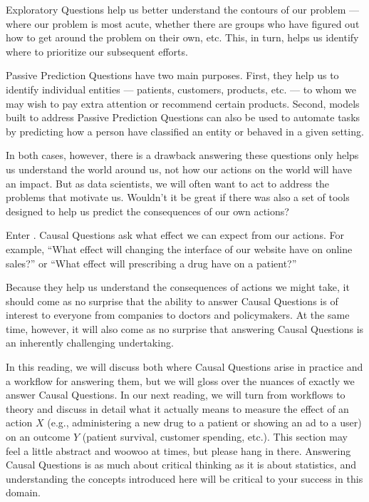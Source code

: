 \documentclass[letterpaper,10pt,english]{jupyterBook}
\begin{document}
\sphinxAtStartPar
Exploratory Questions help us better understand the contours of our problem — where our problem is most acute, whether there are groups who have figured out how to get around the problem on their own, etc. This, in turn, helps us identify where to prioritize our subsequent efforts.

\sphinxAtStartPar
Passive Prediction Questions have two main purposes. First, they help us to identify individual entities — patients, customers, products, etc. — to whom we may wish to pay extra attention or recommend certain products. Second, models built to address Passive Prediction Questions can also be used to automate tasks by predicting how a person  have classified an entity or behaved in a given setting.

\sphinxAtStartPar
In both cases, however, there is a drawback \sphinxhyphen{} answering these questions only helps us understand the world around us, not how our actions on the world will have an impact. But as data scientists, we will often want to act to address the problems that motivate us. Wouldn’t it be great if there was also a set of tools designed to help us predict the consequences of our own actions?

\sphinxAtStartPar
Enter . Causal Questions ask what effect we can expect from our actions. For example, “What effect will changing the interface of our website have on online sales?” or “What effect will prescribing a drug have on a patient?”

\sphinxAtStartPar
Because they help us understand the consequences of actions we might take, it should come as no surprise that the ability to answer Causal Questions is of  interest to everyone from companies to doctors and policymakers. At the same time, however, it will also come as no surprise that answering Causal Questions is an inherently challenging undertaking.

\sphinxAtStartPar
In this reading, we will discuss both where Causal Questions arise in practice and a workflow for answering them, but we will gloss over the nuances of  exactly we answer Causal Questions. In our next reading, we will turn from workflows to theory and discuss in detail what it actually means to measure the effect of an action \(X\) (e.g., administering a new drug to a patient or showing an ad to a user) on an outcome \(Y\) (patient survival, customer spending, etc.). This section may feel a little abstract and woo\sphinxhyphen{}woo at times, but please hang in there. Answering Causal Questions is as much about critical thinking as it is about statistics, and understanding the concepts introduced here will be critical to your success in this domain.
\end{document}

